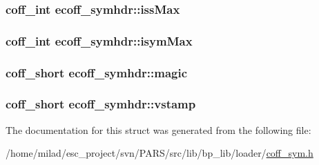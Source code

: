 \label{structecoff__symhdr_a381c27bb3c0fadffe21d1e0fe5944fdd}
\hypertarget{structecoff__symhdr_acfc7e74a0ebb9528528dd9f30987c8ed}{
\subsubsection[{issMax}]{\setlength{\rightskip}{0pt plus 5cm}coff\_\-int {\bf ecoff\_\-symhdr::issMax}}}
\label{structecoff__symhdr_acfc7e74a0ebb9528528dd9f30987c8ed}
\hypertarget{structecoff__symhdr_a5d15acd3562ecad9acd13852e1d04b5a}{
\subsubsection[{isymMax}]{\setlength{\rightskip}{0pt plus 5cm}coff\_\-int {\bf ecoff\_\-symhdr::isymMax}}}
\label{structecoff__symhdr_a5d15acd3562ecad9acd13852e1d04b5a}
\hypertarget{structecoff__symhdr_ae9efacde79d203a1824cfde09a5c6500}{
\subsubsection[{magic}]{\setlength{\rightskip}{0pt plus 5cm}coff\_\-short {\bf ecoff\_\-symhdr::magic}}}
\label{structecoff__symhdr_ae9efacde79d203a1824cfde09a5c6500}
\hypertarget{structecoff__symhdr_a0dbd0fac495bc661ebe3383552013726}{
\subsubsection[{vstamp}]{\setlength{\rightskip}{0pt plus 5cm}coff\_\-short {\bf ecoff\_\-symhdr::vstamp}}}
\label{structecoff__symhdr_a0dbd0fac495bc661ebe3383552013726}


The documentation for this struct was generated from the following file:\begin{DoxyCompactItemize}
\item 
/home/milad/esc\_\-project/svn/PARS/src/lib/bp\_\-lib/loader/\hyperlink{coff__sym_8h}{coff\_\-sym.h}\end{DoxyCompactItemize}
